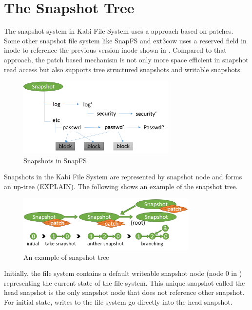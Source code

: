 \section{The Snapshot Tree}

	The snapshot system in Kabi File System uses a approach based on patches. Some other snapshot file system like SnapFS and ext3cow uses a reserved field in inode to reference the previous version inode shown in . Compared to that approach, the patch based mechanism is not only more space efficient in snapshot read access but also supports tree structured snapshots and writable snapshots.

\begin{figure}[hbtp]
\centering
\includegraphics[width=0.7\textwidth]{Chapter-4/figs/fig24.png}
\caption{Snapshots in SnapFS}
\label{fig:snapfs_approach}
\end{figure}

    Snapshots in the Kabi File System are represented by snapshot node and forms an up-tree (EXPLAIN). The following  shows an example of the snapshot tree.

\begin{figure}[hbtp]
\centering
\includegraphics[width=0.8\textwidth]{Chapter-4/figs/fig13.png}
\caption{An example of snapshot tree}
\label{fig:snap_tree_example}
\end{figure}

    Initially, the file system contains a default writeable snapshot node (node 0 in ) representing the current state of the file system. This unique snapshot called the head snapshot is the only snapshot node that does not reference other snapshot. For initial state, writes to the file system go directly into the head snapshot.
    
